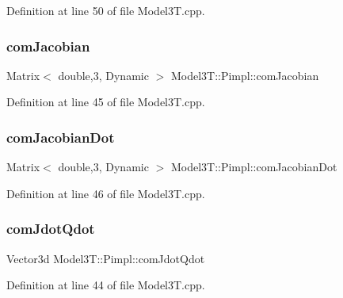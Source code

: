 Definition at line 50 of file Model3\+T.\+cpp.

\hypertarget{structModel3T_1_1Pimpl_ab93624d4ec1d08338eb24528b8a3ca68}{}\label{structModel3T_1_1Pimpl_ab93624d4ec1d08338eb24528b8a3ca68} 
\subsubsection{\texorpdfstring{com\+Jacobian}{comJacobian}}
{\footnotesize\ttfamily Matrix$<$ double,3, Dynamic $>$ Model3\+T\+::\+Pimpl\+::com\+Jacobian}



Definition at line 45 of file Model3\+T.\+cpp.

\hypertarget{structModel3T_1_1Pimpl_ad1f6cba54dc65db31d3a4e54ba00acdf}{}\label{structModel3T_1_1Pimpl_ad1f6cba54dc65db31d3a4e54ba00acdf} 
\subsubsection{\texorpdfstring{com\+Jacobian\+Dot}{comJacobianDot}}
{\footnotesize\ttfamily Matrix$<$ double,3, Dynamic $>$ Model3\+T\+::\+Pimpl\+::com\+Jacobian\+Dot}



Definition at line 46 of file Model3\+T.\+cpp.

\hypertarget{structModel3T_1_1Pimpl_a997711d057aa854ab997992497fe276b}{}\label{structModel3T_1_1Pimpl_a997711d057aa854ab997992497fe276b} 
\subsubsection{\texorpdfstring{com\+Jdot\+Qdot}{comJdotQdot}}
{\footnotesize\ttfamily Vector3d Model3\+T\+::\+Pimpl\+::com\+Jdot\+Qdot}



Definition at line 44 of file Model3\+T.\+cpp.

\hypertarget{structModel3T_1_1Pimpl_a61412bd640cbf9f3bffa791261123328}{}\label{structModel3T_1_1Pimpl_a61412bd640cbf9f3bffa791261123328} 
